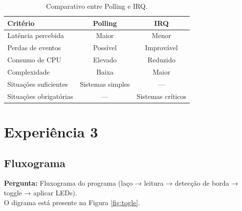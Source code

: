 \documentclass{article}
\begin{document}
\begin{table}[H]
    \centering
    \begin{tabular}{lcc}
        \toprule
        Critério & Polling & IRQ \\
        \midrule
        Latência percebida & Maior & Menor \\
        Perdas de eventos  & Possível & Improvável \\
        Consumo de CPU     & Elevado & Reduzido \\
        Complexidade       & Baixa  & Maior \\
        Situações suficientes & Sistemas simples & --- \\
        Situações obrigatórias & --- & Sistemas críticos \\
        \bottomrule
    \end{tabular}
    \caption{Comparativo entre Polling e IRQ.}
    \label{tab:polling_irq}
\end{table}

\section{Experiência 3}

\subsection{Fluxograma}
\noindent
\textbf{Pergunta:} Fluxograma do programa (laço → leitura → detecção de borda → toggle → aplicar LEDs). \\

\noindent
O digrama está presente na Figura \ref{fig:togle}. \\
\end{document}
